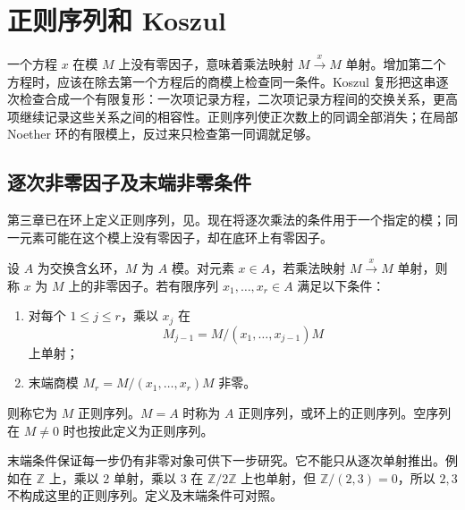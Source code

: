 
% 
% 

\section{正则序列和 Koszul}
\label{g5:sec:0802}

一个方程 \(x\) 在模 \(M\) 上没有零因子，意味着乘法映射 \(M\xrightarrow{x}M\) 单射。增加第二个方程时，应该在除去第一个方程后的商模上检查同一条件。Koszul 复形把这串逐次检查合成一个有限复形：一次项记录方程，二次项记录方程间的交换关系，更高项继续记录这些关系之间的相容性。正则序列使正次数上的同调全部消失；在局部 Noether 环的有限模上，反过来只检查第一同调就足够。

\subsection{逐次非零因子及末端非零条件}
\label{g5:subsec:0802:01}

第三章已在环上定义正则序列，见。现在将逐次乘法的条件用于一个指定的模；同一元素可能在这个模上没有零因子，却在底环上有零因子。

\begin{definition}\label{g5:def:module-regular-sequence}
	设 \(A\) 为交换含幺环，\(M\) 为 \(A\) 模。对元素 \(x\in A\)，若乘法映射 \(M\xrightarrow{x}M\) 单射，则称 \(x\) 为 \(M\) 上的非零因子。若有限序列 \(x_1,\ldots,x_r\in A\) 满足以下条件：
	\begin{enumerate}
		\item 对每个 \(1\leq j\leq r\)，乘以 \(x_j\) 在
		\[
			M_{j-1}=M/(x_1,\ldots,x_{j-1})M
		\]
		上单射；
		\item 末端商模 \(M_r=M/(x_1,\ldots,x_r)M\) 非零。
	\end{enumerate}
	则称它为 \(M\) 正则序列。\(M=A\) 时称为 \(A\) 正则序列，或环上的正则序列。空序列在 \(M\ne0\) 时也按此定义为正则序列。
\end{definition}

末端条件保证每一步仍有非零对象可供下一步研究。它不能只从逐次单射推出。例如在 \(\mathbb Z\) 上，乘以 \(2\) 单射，乘以 \(3\) 在 \(\mathbb Z/2\mathbb Z\) 上也单射，但 \(\mathbb Z/(2,3)=0\)，所以 \(2,3\) 不构成这里的正则序列。定义及末端条件可对照\cite[第16节开头，第123页]{Matsumura1989}。

